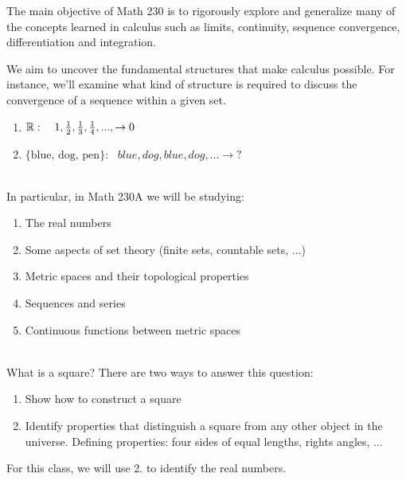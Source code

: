 The main objective of Math 230 is to rigorously explore and generalize many of the concepts learned in calculus such as limits, continuity, sequence convergence, differentiation and integration. 

\begin{remark}
    We aim to uncover the fundamental structures that make calculus possible. For instance, we'll examine what kind of structure is required to discuss the convergence of a sequence within a given set.
    \begin{enumerate}
        \item $\mathbb{R}: ~~~1, \frac{1}{2}, \frac{1}{3}, \frac{1}{4}, ..., \to 0$
        \item $\{\text{blue, dog, pen}\}: ~~~ blue, dog, blue, dog, ... \to ?$
    \end{enumerate}
\end{remark}
\leavevmode \\
In particular, in Math 230A we will be studying:
\begin{enumerate}[1.]
    \item The real numbers
    \item Some aspects of set theory (finite sets, countable sets, ...)
    \item Metric spaces and their topological properties
    \item Sequences and series
    \item Continuous functions between metric spaces
\end{enumerate}
\leavevmode \\
What is a square? There are two ways to answer this question:
\begin{enumerate}[1.]
    \item Show how to construct a square
    \item Identify properties that distinguish a square from any other object in the universe. Defining properties: four sides of equal lengths, rights angles, ...
\end{enumerate}
For this class, we will use 2. to identify the real numbers.

